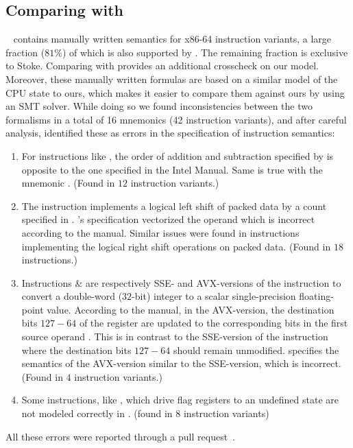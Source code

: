 \subsection{Comparing with \Stoke}
\Stoke~\cite{Stoke2013} contains manually written semantics for \stokeIS{} x86-64 instruction variants, a large fraction ($81\%$) of which is also supported by \Strata. The remaining fraction is exclusive to Stoke. Comparing with \Stoke provides an additional crosscheck on our model.  Moreover, these manually written formulas are based on a similar model of the CPU state to ours, which makes it easier to compare them against ours by using an SMT solver. While doing so we found inconsistencies between the two formalisms in a total of 16 mnemonics (42 instruction variants), and after careful analysis, identified these as errors in the \Stoke specification of instruction semantics:
\begin{enumerate}
    \item For instructions like  , the order of addition and subtraction specified by \Stoke is opposite to the one specified in the Intel Manual. Same is true with the mnemonic . (Found in $12$ instruction variants.)
    
    \item  The instruction  implements a logical left shift of packed data by a count specified in . \Stoke's specification vectorized the operand  which is incorrect according to the manual. Similar issues were found in instructions implementing the logical right shift operations on packed data. (Found in  $18$ instructions.)
    
    \item Instructions  \&   are respectively SSE- and AVX-versions of the instruction to  convert a double-word ($32$-bit) integer to a scalar single-precision floating-point value. According to the manual, in the AVX-version,  the  destination bits $127-64$ of the  register  are updated to the corresponding bits in the first source operand . This  is in contrast to the SSE-version of the instruction where the destination bits $127-64$ should remain unmodified. \Stoke specifies the semantics of the AVX-version similar to the SSE-version, which is incorrect.  (Found in $4$ instruction variants.)
    
    \item Some instructions, like , which drive flag registers to an undefined state are not modeled correctly in \Stoke.    (found in $8$ instruction variants)  
\end{enumerate}
All these errors were reported through a pull request~\cite{Suppl}.

